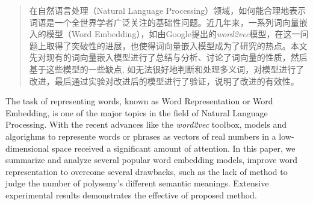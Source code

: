 ﻿\begin{abstract}

在自然语言处理（Natural Language Processing）领域，如何能合理地表示词语是一个全世界学者广泛关注的基础性问题。近几年来，一系列词向量嵌入的模型（Word Embedding），如由Google提出的\emph{word2vec}模型，在这一问题上取得了突破性的进展，也使得词向量嵌入模型成为了研究的热点。本文先对现有的词向量嵌入模型进行了总结与分析、讨论了词向量的性质，然后基于这些模型的一些缺点, 如无法很好地判断和处理多义词，对模型进行了改进，最后通过实验对改进后的模型进行了验证，说明了改进的有效性。

\end{abstract}

\begin{enabstract}

The task of representing words, known as Word Representation or Word Embedding, is one of the major topics in the field of Natural Language Processing. With the recent advances like the \emph{word2vec} toolbox, models and algorighms to represente words or phrases as vectors of real numbers in a low-dimensional space received a significant amount of attention. In this paper, we summarize and analyze several popular word embedding models, improve word representation to overcome several drawbacks, such as the lack of method to judge the number of polysemy's different semantic meanings. Extensive experimental results demonstrates the effective of proposed method.

\end{enabstract}

